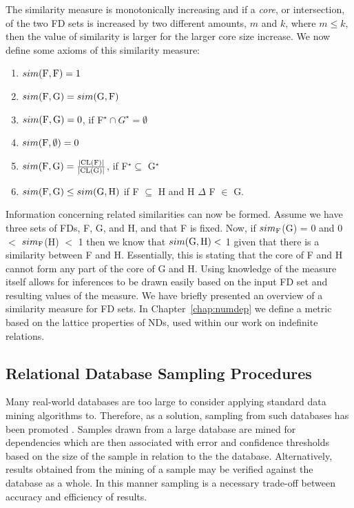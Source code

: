 The similarity measure is monotonically increasing and if a {\em
core}, or intersection, of the two FD sets is
increased by two different amounts, $m$ and $k$, where $m \le k$, then
the value of similarity is larger for the larger core size
increase. We now define some axioms of this similarity measure:
\begin{enumerate}
\item $sim({\rm F}, {\rm F}) = 1$
\item $sim({\rm F}, {\rm G}) = sim({\rm G}, {\rm F})$
\item $sim({\rm F}, {\rm G}) = 0$, if F$^\star \cap G^\star = \emptyset$
\item $sim({\rm F}, \emptyset) = 0$
\item $sim({\rm F}, {\rm G}) = \frac{|{\rm CL(F)}|}{ |{\rm CL(G)}|}$, if F$^\star \subseteq$ G$^\star$
\item  $sim({\rm F},{\rm G}) \le sim({\rm G},{\rm H})$ if F
$\subseteq$ H and H $\Delta$ F $\in$ G. 
\end{enumerate}

Information concerning related similarities can now be formed. Assume we
have three sets of FDs, F, G, and H, and that F is
fixed. Now, if $sim_{\rm F}$(G) = 0 and 0 $<$ $sim_{\rm F}$(H) $<$ 1
then we know 
that $sim({\rm G},{\rm H}) <$ 1 given that there is a similarity between F and
H. Essentially, this is stating that the core of F and H cannot 
form any part of the core of G and H. Using 
knowledge of the measure itself allows for inferences to be drawn
easily based on the input FD set and resulting values of the
measure. We have briefly
presented an overview of a similarity measure for FD sets. In
Chapter~\ref{chap:numdep} we define a metric based on the lattice
properties of NDs, used within our work on indefinite relations.

\subsection{Relational Database Sampling Procedures}\label{subsec:dat_samp}

Many real-world databases are too large to consider applying standard
data mining algorithms to. Therefore, as a solution, sampling from
such databases has been promoted \cite{km94,toi96b}. Samples drawn
from a large database are mined for dependencies which are then
associated with error and confidence thresholds based on the size of
the sample in relation to the the database. Alternatively, results
obtained from the mining of a sample may be verified against the
database as a whole. In this manner sampling is a necessary trade-off
between accuracy and efficiency of results.

